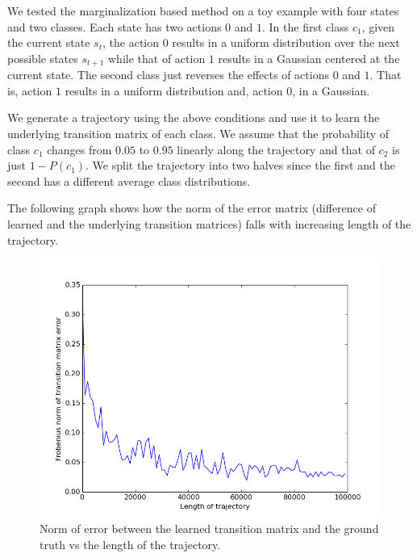 \documentclass{article}[11pt]
\begin{document}
We tested the marginalization based method on a toy example with four states and two classes. Each state has two actions $0$ and $1$. In the first class $c_1$, given the current state $s_t$, the action $0$ results in a uniform distribution over the next possible states $s_{t+1}$ while that of action $1$ results in a Gaussian centered at the current state. The second class just reverses the effects of actions $0$ and $1$. That is, action $1$ results in a uniform distribution and, action $0$, in a Gaussian.

We generate a trajectory using the above conditions and use it to learn the underlying transition matrix of each class. We assume that the probability of class $c_1$ changes from $0.05$ to $0.95$ linearly along the trajectory and that of $c_2$ is just $1 - P(c_1)$. We split the trajectory into two halves since the first and the second has a different average class distributions. 


The following graph shows how the norm of the error matrix (difference of learned and the underlying transition matrices) falls with increasing length of the trajectory. 

\begin{figure}[H]
\centering
\includegraphics[width=1.2\linewidth]{images/error_vs_l}
\caption{Norm of error between the learned transition matrix and the ground truth vs the length of the trajectory.}
\end{figure}

\end{document}
